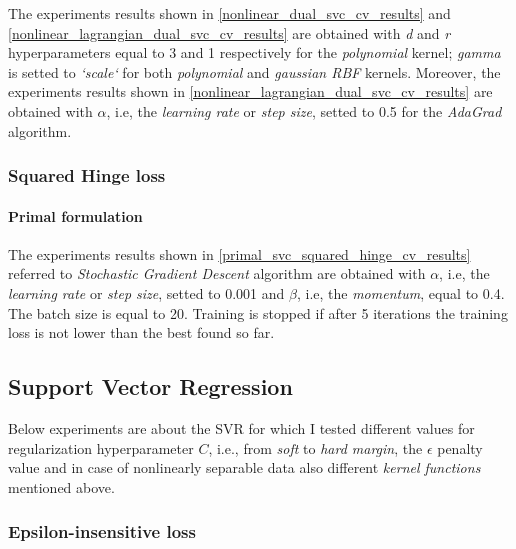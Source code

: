 The experiments results shown in \ref{nonlinear_dual_svc_cv_results} and \ref{nonlinear_lagrangian_dual_svc_cv_results} are obtained with \emph{d} and \emph{r} hyperparameters equal to 3 and 1 respectively for the \emph{polynomial} kernel; \emph{gamma} is setted to \emph{`scale`} for both \emph{polynomial} and \emph{gaussian RBF} kernels. Moreover, the experiments results shown in \ref{nonlinear_lagrangian_dual_svc_cv_results} are obtained with $\alpha$, i.e, the \emph{learning rate} or \emph{step size}, setted to 0.5 for the \emph{AdaGrad} algorithm.






\subsubsection{Squared Hinge loss}

\paragraph{Primal formulation}

The experiments results shown in \ref{primal_svc_squared_hinge_cv_results} referred to \emph{Stochastic Gradient Descent} algorithm are obtained with $\alpha$, i.e, the \emph{learning rate} or \emph{step size}, setted to 0.001 and $\beta$, i.e, the \emph{momentum}, equal to 0.4. The batch size is equal to 20. Training is stopped if after 5 iterations the training loss is not lower than the best found so far.





\subsection{Support Vector Regression}

Below experiments are about the SVR for which I tested different values for regularization hyperparameter $C$, i.e., from \emph{soft} to \emph{hard margin}, the $\epsilon$ penalty value and in case of nonlinearly separable data also different \emph{kernel functions} mentioned above.

\subsubsection{Epsilon-insensitive loss}

